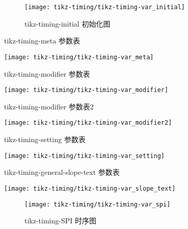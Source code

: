 \begin{figure}[H]
  \centering
  \texttt{[image: tikz-timing/tikz-timing-var\_initial]}\\
  \caption{tikz-timing-initial 初始化图}\label{tikz-timing-var_initial}
\end{figure}

\begin{table}[H]
  \centering
    \caption{tikz-timing-meta 参数表}\label{tikz-timing-var_meta}
  \texttt{[image: tikz-timing/tikz-timing-var\_meta]}\\
\end{table}

\begin{table}[H]
  \centering
  \caption{tikz-timing-modifier 参数表}\label{tikz-timing-var_modifier}
  \texttt{[image: tikz-timing/tikz-timing-var\_modifier]}\\
\end{table}

\begin{table}[H]
  \centering
  \caption{tikz-timing-modifier 参数表2}\label{tikz-timing-var_modifier2}
  \texttt{[image: tikz-timing/tikz-timing-var\_modifier2]}\\
\end{table}



\begin{table}[H]
  \centering
  \caption{tikz-timing-setting 参数表}
  \texttt{[image: tikz-timing/tikz-timing-var\_setting]}\\
  
  \label{tikz-timing-var_setting}
\end{table}
\begin{table}[H]
  \centering
   \caption{tikz-timing-general-slope-text 参数表}
  \texttt{[image: tikz-timing/tikz-timing-var\_slope\_text]}\\
 
  \label{tikz-timing-var_slope_text}
\end{table}

\begin{figure}[H]
  \centering
  \texttt{[image: tikz-timing/tikz-timing-var\_spi]}\\
  \caption{tikz-timing-SPI 时序图}
  \label{tikz-timing-var_spi}
\end{figure}




